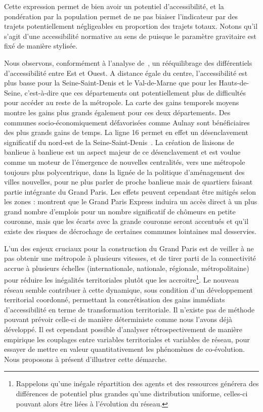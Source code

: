 Cette expression permet de bien avoir un potentiel d'accessibilité, et la pondération par la population permet de ne pas biaiser l'indicateur par des trajets potentiellement négligeables en proportion des trajets totaux. Notons qu'il s'agit d'une accessibilité normative au sens de \cite{paez2012measuring} puisque le paramètre gravitaire est fixé de manière stylisée.


Nous observons, conformément à l'analyse de~\cite{beaucire2013grand}, un rééquilibrage des différentiels d'accessibilité entre Est et Ouest. A distance égale du centre, l'accessibilité est plus basse pour la Seine-Saint-Denis et le Val-de-Marne que pour les Hauts-de-Seine, c'est-à-dire que ces départements ont potentiellement plus de difficultés pour accéder au reste de la métropole. La carte des gains temporels moyens montre les gains plus grands également pour ces deux départements. Des communes socio-économiquement défavorisées comme Aulnay sont bénéficiaires des plus grands gains de temps. La ligne 16 permet en effet un désenclavement significatif du nord-est de la Seine-Saint-Denis~\cite{desjardins2016grand}. La création de liaisons de banlieue à banlieue est un aspect majeur de ce désenclavement et est voulue comme un moteur de l'émergence de nouvelles centralités, vers une métropole toujours plus polycentrique, dans la lignée de la politique d'aménagement des villes nouvelles, pour ne plus parler de proche banlieue mais de quartiers faisant partie intégrante du Grand Paris. Les effets peuvent cependant être mitigés selon les zones : \cite{l2013grand} montrent que le Grand Paris Express induira un accès direct à un plus grand nombre d'emplois pour un nombre significatif de chômeurs en petite couronne, mais que les écarts avec la grande couronne seront accentués et qu'il existe des risques de décrochage de certaines communes lointaines mal desservies. 


L'un des enjeux cruciaux pour la construction du Grand Paris est de veiller à ne pas obtenir une métropole à plusieurs vitesses, et de tirer parti de la connectivité accrue à plusieurs échelles (internationale, nationale, régionale, métropolitaine) pour réduire les inégalités territoriales plutôt que les accroitre\footnote{Rappelons qu'une inégale répartition des agents et des ressources générera des différences de potentiel plus grandes qu'une distribution uniforme, celles-ci pouvant alors être liées à l'évolution du réseau.}. Le nouveau réseau semble contribuer à cette dynamique, sous condition d'un développement territorial coordonné, permettant la concrétisation des gains immédiats d'accessibilité en terme de transformation territoriale. Il n'existe pas de méthode pouvant prévoir celle-ci de manière déterministe comme nous l'avons déjà développé. Il est cependant possible d'analyser rétrospectivement de manière empirique les couplages entre variables territoriales et variables de réseau, pour essayer de mettre en valeur quantitativement les phénomènes de co-évolution. Nous proposons à présent d'illustrer cette démarche.






